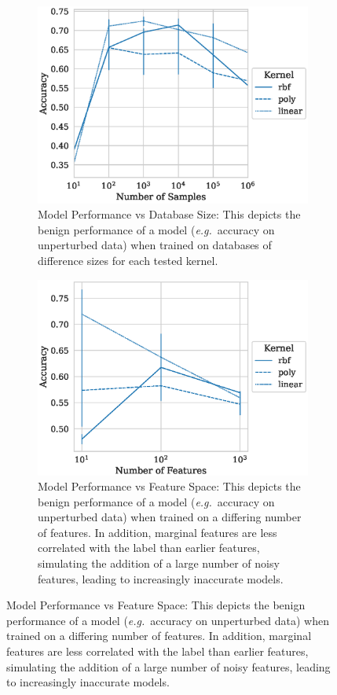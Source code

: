 \documentclass[fonts]{icst}
\begin{document}
\begin{figure}
    \centering
    \begin{subfigure}{.45\textwidth}
        \centering
        \includegraphics[width=\textwidth]{./generated/accuracy_vs_samples.eps}
        \caption{Model Performance vs Database Size: This depicts the benign performance  of a model  (\textit{e.g.}~accuracy on unperturbed data) when trained on databases of difference sizes for each tested kernel.}
        \label{fig:samples_acc}
    \end{subfigure}
    \hfill
    \begin{subfigure}{.45\textwidth}
        \centering
        \includegraphics[width=\textwidth]{./generated/accuracy_vs_features.eps}
        \caption{Model Performance vs Feature Space: This depicts the benign performance of a model (\textit{e.g.}~accuracy on unperturbed data) when trained on a differing number of features. In addition, marginal features are less correlated with the label than earlier features, simulating the addition of a large number of noisy features, leading to increasingly inaccurate models.}

\end{subfigure}
\end{figure}
\end{document}
